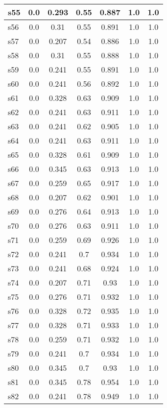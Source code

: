 \documentclass{article}
\begin{document}
\begin{tabular}{|l|c|c|c|c|c|c|}
\hline
s55 &0.0 & 0.293 & 0.55 & 0.887 & 1.0 & 1.0\\
\hline
s56 &0.0 & 0.31 & 0.55 & 0.891 & 1.0 & 1.0\\
\hline
s57 &0.0 & 0.207 & 0.54 & 0.886 & 1.0 & 1.0\\
\hline
s58 &0.0 & 0.31 & 0.55 & 0.888 & 1.0 & 1.0\\
\hline
s59 &0.0 & 0.241 & 0.55 & 0.891 & 1.0 & 1.0\\
\hline
s60 &0.0 & 0.241 & 0.56 & 0.892 & 1.0 & 1.0\\
\hline
s61 &0.0 & 0.328 & 0.63 & 0.909 & 1.0 & 1.0\\
\hline
s62 &0.0 & 0.241 & 0.63 & 0.911 & 1.0 & 1.0\\
\hline
s63 &0.0 & 0.241 & 0.62 & 0.905 & 1.0 & 1.0\\
\hline
s64 &0.0 & 0.241 & 0.63 & 0.911 & 1.0 & 1.0\\
\hline
s65 &0.0 & 0.328 & 0.61 & 0.909 & 1.0 & 1.0\\
\hline
s66 &0.0 & 0.345 & 0.63 & 0.913 & 1.0 & 1.0\\
\hline
s67 &0.0 & 0.259 & 0.65 & 0.917 & 1.0 & 1.0\\
\hline
s68 &0.0 & 0.207 & 0.62 & 0.901 & 1.0 & 1.0\\
\hline
s69 &0.0 & 0.276 & 0.64 & 0.913 & 1.0 & 1.0\\
\hline
s70 &0.0 & 0.276 & 0.63 & 0.911 & 1.0 & 1.0\\
\hline
s71 &0.0 & 0.259 & 0.69 & 0.926 & 1.0 & 1.0\\
\hline
s72 &0.0 & 0.241 & 0.7 & 0.934 & 1.0 & 1.0\\
\hline
s73 &0.0 & 0.241 & 0.68 & 0.924 & 1.0 & 1.0\\
\hline
s74 &0.0 & 0.207 & 0.71 & 0.93 & 1.0 & 1.0\\
\hline
s75 &0.0 & 0.276 & 0.71 & 0.932 & 1.0 & 1.0\\
\hline
s76 &0.0 & 0.328 & 0.72 & 0.935 & 1.0 & 1.0\\
\hline
s77 &0.0 & 0.328 & 0.71 & 0.933 & 1.0 & 1.0\\
\hline
s78 &0.0 & 0.259 & 0.71 & 0.932 & 1.0 & 1.0\\
\hline
s79 &0.0 & 0.241 & 0.7 & 0.934 & 1.0 & 1.0\\
\hline
s80 &0.0 & 0.345 & 0.7 & 0.93 & 1.0 & 1.0\\
\hline
s81 &0.0 & 0.345 & 0.78 & 0.954 & 1.0 & 1.0\\
\hline
s82 &0.0 & 0.241 & 0.78 & 0.949 & 1.0 & 1.0\\
\hline

\end{tabular}
\end{document}
